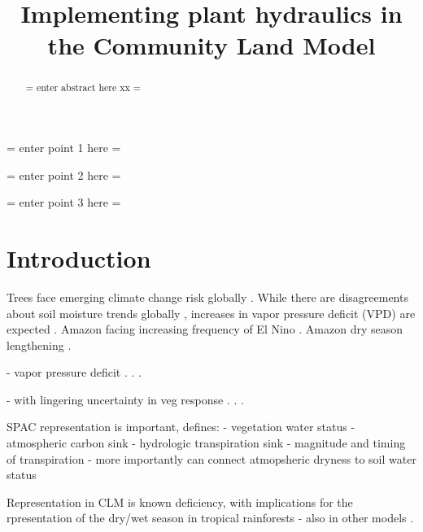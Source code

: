 \documentclass[draft,linenumbers]{agujournal}
\begin{document}
\title{Implementing plant hydraulics in the Community Land Model}



\begin{keypoints}
\item = enter point 1 here = 
\item = enter point 2 here = 
\item = enter point 3 here = 
\end{keypoints}


\begin{abstract}
= enter abstract here xx =
\end{abstract}


\section{Introduction}

Trees face emerging climate change risk globally \citep{allen2010,anderegg2013b}.
While there are disagreements about soil moisture trends globally \citep{dai2013,sheffield2012}, 
  increases in vapor pressure deficit (VPD) are expected \citep{ficklin2017}.
Amazon facing increasing frequency of El Nino \citep{cai2014}.
Amazon dry season lengthening \citep{fu2013}.



     


 - vapor pressure deficit 
      . \citep{mcdowell2015}
      . \citep{novick2016b}
      . \citep{williams2013}

 - with lingering uncertainty in veg response
      . \citep{dekauwe2017}
      . \citep{friedlingstein2014}
      . \citep{anderegg2015b}



SPAC representation is important, defines:
  - vegetation water status
  - atmospheric carbon sink
  - hydrologic transpiration sink
  - magnitude and timing of transpiration
  - more importantly can connect atmopsheric dryness to soil water status

Representation in CLM is known deficiency, with implications for the rpresentation of the dry/wet season in tropical rainforests
  - also in other models
      . \citep{powell2013,ukkola2016}
\end{document}
